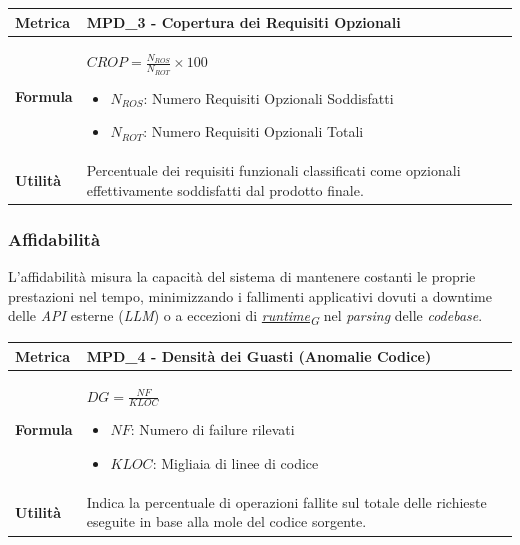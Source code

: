 \documentclass[12pt, a4paper]{article}
\newcommand{\urlglossario}{https://skynetunigroup.github.io/Code_Guardian/Documentazione/PB/glossario_v2.0.0.pdf} %
\newcommand{\glo}[2]{\href{\urlglossario\#nameddest=#2}{#1\textsubscript{G}}}
\begin{document}
\begin{table}[H]
\centering
\renewcommand{\arraystretch}{1.5}
\begin{tabular}{|l|p{12cm}|}
\hline
\textbf{Metrica} & MPD\_3 - Copertura dei Requisiti Opzionali \\ \hline
\textbf{Formula} & $CROP = \frac{N_{ROS}}{N_{ROT}} \times 100$
\begin{itemize}
    \item $N_{ROS}$: Numero Requisiti Opzionali Soddisfatti
    \item $N_{ROT}$: Numero Requisiti Opzionali Totali
\end{itemize} \\ \hline
\textbf{Utilità} & Percentuale dei requisiti funzionali classificati come opzionali effettivamente soddisfatti dal prodotto finale. \\ \hline
\end{tabular}
\end{table}


\subsubsection{Affidabilità}
L'affidabilità misura la capacità del sistema di mantenere costanti le proprie prestazioni nel tempo, minimizzando i fallimenti applicativi dovuti a downtime delle \textit{API} esterne (\textit{LLM}) o a eccezioni di \textit{\glo{runtime}{runtime}} nel \textit{parsing} delle \textit{codebase}.

\begin{table}[H]
\centering
\renewcommand{\arraystretch}{1.5}
\begin{tabular}{|l|p{12cm}|}
\hline
\textbf{Metrica} & MPD\_4 - Densità dei Guasti (Anomalie Codice) \\ \hline
\textbf{Formula} & $DG = \frac{NF}{KLOC}$
\begin{itemize}
    \item $NF$: Numero di failure rilevati
    \item $KLOC$: Migliaia di linee di codice 
\end{itemize} \\ \hline
\textbf{Utilità} & Indica la percentuale di operazioni fallite sul totale delle richieste eseguite in base alla mole del codice sorgente. \\ \hline
\end{tabular}
\end{table}
\end{document}
